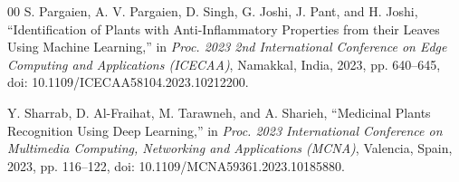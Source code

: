 \documentclass[conference]{IEEEtran}
\begin{document}
\begin{thebibliography}{00}
S. Pargaien, A. V. Pargaien, D. Singh, G. Joshi, J. Pant, and H. Joshi, ``Identification of Plants with Anti-Inflammatory Properties from their Leaves Using Machine Learning,'' in \textit{Proc. 2023 2nd International Conference on Edge Computing and Applications (ICECAA)}, Namakkal, India, 2023, pp. 640--645, doi: 10.1109/ICECAA58104.2023.10212200.

Y. Sharrab, D. Al-Fraihat, M. Tarawneh, and A. Sharieh, ``Medicinal Plants Recognition Using Deep Learning,'' in \textit{Proc. 2023 International Conference on Multimedia Computing, Networking and Applications (MCNA)}, Valencia, Spain, 2023, pp. 116--122, doi: 10.1109/MCNA59361.2023.10185880.

\end{thebibliography}
\end{document}
